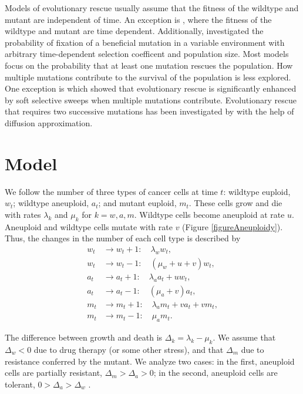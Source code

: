 \documentclass[12pt]{extarticle}
\begin{document}
Models of evolutionary rescue usually assume that the fitness of the wildtype and mutant are independent of time. An exception is \cite{marrec2020adapt}, where the fitness of the wildtype and mutant are time dependent. Additionally, \cite{uecker2011fixation} investigated the probability of fixation of a beneficial mutation in a variable environment with arbitrary time-dependent selection coefficent and population size.
Most models focus on the probability that at least one mutation rescues the population. How multiple mutations contribute to the survival of the population is less explored. One exception is \cite{wilson2017soft} which showed that evolutionary rescue is significantly enhanced by soft selective sweeps when multiple mutations contribute. 
Evolutionary rescue that requires two successive mutations has been investigated by \cite{martin2013probability} with the help of diffusion approximation.


\section*{Model}

We follow the number of three types of cancer cells at time $t$: wildtype euploid, $w_t$; wildtype aneuploid, $a_t$; and mutant euploid, $m_t$. 
These cells grow and die with rates $\lambda_k$ and $\mu_k$ for $k=w, a, m$.
Wildtype cells become aneuploid at rate $u$. Aneuploid and wildtype cells mutate with rate $v$ (Figure \ref{figureAneuploidy}). 
Thus, the changes in the number of each cell type is described by
\begin{subequations}
\begin{flalign}
w_t&\rightarrow w_t+1:\quad \lambda_ww_t,\\
w_t&\rightarrow w_t-1:\quad \left(\mu_w+u+v\right)w_t,\\
a_t&\rightarrow a_t+1:\quad \lambda_aa_t+uw_t,\\
a_t&\rightarrow a_t-1:\quad \left(\mu_a+v\right)a_t,\\
m_t&\rightarrow m_t+1:\quad \lambda_am_t+va_t+vm_t,\\
m_t&\rightarrow m_t-1:\quad \mu_am_t.
\end{flalign}
\end{subequations}

The difference between growth and death is $\Delta_k = \lambda_k-\mu_k$.
We assume that $\Delta_w<0$ due to drug therapy (or some other stress), and that $\Delta_m$ due to resistance conferred by the mutant.
We analyze two cases: in the first, aneuploid cells are partially resistant, $\Delta_m>\Delta_a>0$; in the second, aneuploid cells are tolerant, %
$0>\Delta_a>\Delta_w$  \cite{brauner2016distinguishing}.
\end{document}
